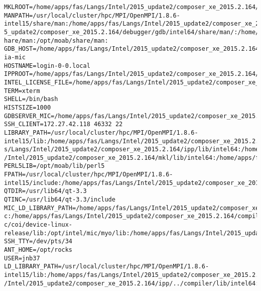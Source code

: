 \documentclass[11pt]{article}
\begin{document}
\begin{verbatim}
MKLROOT=/home/apps/fas/Langs/Intel/2015_update2/composer_xe_2015.2.164/mkl
MANPATH=/usr/local/cluster/hpc/MPI/OpenMPI/1.8.6-intel15/share/man:/home/apps/fas/Langs/Intel/2015_update2/composer_xe_2015.2.164/man/en_US:/home/apps/fas/Langs/Intel/201
5_update2/composer_xe_2015.2.164/debugger/gdb/intel64/share/man/:/home/apps/fas/Langs/Intel/2015_update2/composer_xe_2015.2.164/debugger/gdb/intel64_mic/share/man/:/usr/s
hare/man:/opt/moab/share/man:
GDB_HOST=/home/apps/fas/Langs/Intel/2015_update2/composer_xe_2015.2.164/debugger/gdb/intel64_mic/bin/gdb-ia-mic
HOSTNAME=login-0-0.local
IPPROOT=/home/apps/fas/Langs/Intel/2015_update2/composer_xe_2015.2.164/ipp
INTEL_LICENSE_FILE=/home/apps/fas/Langs/Intel/2015_update2/composer_xe_2015.2.164/licenses:/opt/intel/licenses:/home/apps/fas/Licenses/intel_site.lic
TERM=xterm
SHELL=/bin/bash
HISTSIZE=1000
GDBSERVER_MIC=/home/apps/fas/Langs/Intel/2015_update2/composer_xe_2015.2.164/debugger/gdb/target/mic/bin/gdbserver
SSH_CLIENT=172.27.42.118 46332 22
LIBRARY_PATH=/usr/local/cluster/hpc/MPI/OpenMPI/1.8.6-intel15/lib:/home/apps/fas/Langs/Intel/2015_update2/composer_xe_2015.2.164/ipp/../compiler/lib/intel64:/home/apps/fa
s/Langs/Intel/2015_update2/composer_xe_2015.2.164/ipp/lib/intel64:/home/apps/fas/Langs/Intel/2015_update2/composer_xe_2015.2.164/compiler/lib/intel64:/home/apps/fas/Langs
/Intel/2015_update2/composer_xe_2015.2.164/mkl/lib/intel64:/home/apps/fas/Langs/Intel/2015_update2/composer_xe_2015.2.164/tbb/lib/intel64/gcc4.4
PERL5LIB=/opt/moab/lib/perl5
FPATH=/usr/local/cluster/hpc/MPI/OpenMPI/1.8.6-intel15/include:/home/apps/fas/Langs/Intel/2015_update2/composer_xe_2015.2.164/mkl/include
QTDIR=/usr/lib64/qt-3.3
QTINC=/usr/lib64/qt-3.3/include
MIC_LD_LIBRARY_PATH=/home/apps/fas/Langs/Intel/2015_update2/composer_xe_2015.2.164/mpirt/lib/mic:/home/apps/fas/Langs/Intel/2015_update2/composer_xe_2015.2.164/ipp/lib/mi
c:/home/apps/fas/Langs/Intel/2015_update2/composer_xe_2015.2.164/compiler/lib/mic:/home/apps/fas/Langs/Intel/2015_update2/composer_xe_2015.2.164/mkl/lib/mic:/opt/intel/mi
c/coi/device-linux-release/lib:/opt/intel/mic/myo/lib:/home/apps/fas/Langs/Intel/2015_update2/composer_xe_2015.2.164/tbb/lib/mic
SSH_TTY=/dev/pts/34
ANT_HOME=/opt/rocks
USER=jnb37
LD_LIBRARY_PATH=/usr/local/cluster/hpc/MPI/OpenMPI/1.8.6-intel15/lib:/home/apps/fas/Langs/Intel/2015_update2/composer_xe_2015.2.164/mpirt/lib/intel64:/home/apps/fas/Langs
/Intel/2015_update2/composer_xe_2015.2.164/ipp/../compiler/lib/intel64:/home/apps/fas/Langs/Intel/2015_update2/composer_xe_2015.2.164/ipp/lib/intel64:/home/apps/fas/Langs

\end{verbatim}
\end{document}
